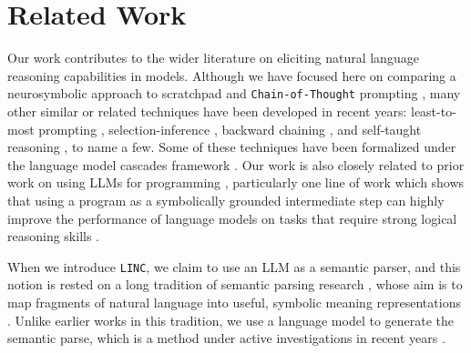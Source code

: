 \documentclass[11pt]{article}
\begin{document}
\section{Related Work} \label{sec:related_work}

Our work contributes to the wider literature on eliciting natural language reasoning capabilities in models.
Although we have focused here on comparing a neurosymbolic approach to scratchpad \cite{nye2021show} and \texttt{Chain-of-Thought} prompting \cite{wei2022chain, kojima2022large, wang2022self}, many other similar or related techniques have been developed in recent years: least-to-most prompting \cite{zhou2022least}, selection-inference \cite{creswell2022selection}, backward chaining \cite{kazemi2022lambada}, and self-taught reasoning \cite{zelikman2022star}, to name a few. Some of these techniques have been formalized under the language model cascades framework \cite{dohan2022language}.
Our work is also closely related to prior work on using LLMs for programming \cite{chen2021evaluating}, particularly 
one line of work which shows that using a program as a symbolically grounded intermediate step can highly improve the performance of language models on tasks that require strong logical reasoning skills \citep{drori2022neural, gao2022pal}. 

When we introduce \texttt{LINC}, we claim to use an LLM as a semantic parser, and this notion is rested on a long tradition of semantic parsing research \cite{kamath2019survey}, whose aim is to map fragments of natural language into useful, symbolic meaning representations \cite{zelle1996learning, zettlemoyer2005learning, berant2013semantic, liang2013learning}. Unlike earlier works in this tradition, we use a language model to generate the semantic parse, which is a method under active investigations in recent years \cite{shin2021few, drozdov2022compositional, wang2023grammar}.
\end{document}
